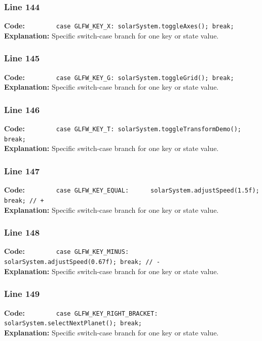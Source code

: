 \documentclass[11pt,a4paper]{article}
\begin{document}
\subsubsection*{Line 144}
\textbf{Code:} \verb|        case GLFW_KEY_X: solarSystem.toggleAxes(); break;|\\
\textbf{Explanation:} Specific switch-case branch for one key or state value.

\subsubsection*{Line 145}
\textbf{Code:} \verb|        case GLFW_KEY_G: solarSystem.toggleGrid(); break;|\\
\textbf{Explanation:} Specific switch-case branch for one key or state value.

\subsubsection*{Line 146}
\textbf{Code:} \verb|        case GLFW_KEY_T: solarSystem.toggleTransformDemo(); break;|\\
\textbf{Explanation:} Specific switch-case branch for one key or state value.

\subsubsection*{Line 147}
\textbf{Code:} \verb|        case GLFW_KEY_EQUAL:      solarSystem.adjustSpeed(1.5f); break; // +|\\
\textbf{Explanation:} Specific switch-case branch for one key or state value.

\subsubsection*{Line 148}
\textbf{Code:} \verb|        case GLFW_KEY_MINUS:      solarSystem.adjustSpeed(0.67f); break; // -|\\
\textbf{Explanation:} Specific switch-case branch for one key or state value.

\subsubsection*{Line 149}
\textbf{Code:} \verb|        case GLFW_KEY_RIGHT_BRACKET: solarSystem.selectNextPlanet(); break;|\\
\textbf{Explanation:} Specific switch-case branch for one key or state value.
\end{document}
